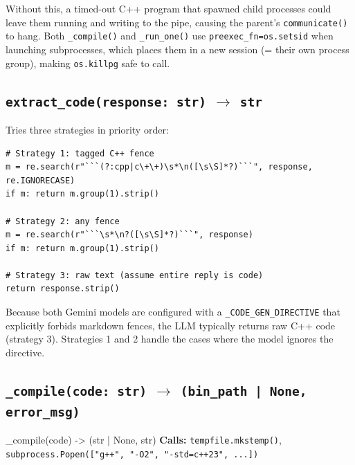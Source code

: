 \documentclass[11pt,a4paper]{report}
\newcommand{\fn}[1]{\texttt{#1}}
\begin{document}
Without this, a timed-out C++ program that spawned child processes could leave them
running and writing to the pipe, causing the parent's \fn{communicate()} to hang.
Both \fn{\_compile()} and \fn{\_run\_one()} use \fn{preexec\_fn=os.setsid} when launching
subprocesses, which places them in a new session (= their own process group), making
\fn{os.killpg} safe to call.

\subsection{\fn{extract\_code(response: str)} $\to$ \fn{str}}

Tries three strategies in priority order:
\begin{lstlisting}[style=example]
# Strategy 1: tagged C++ fence
m = re.search(r"```(?:cpp|c\+\+)\s*\n([\s\S]*?)```", response, re.IGNORECASE)
if m: return m.group(1).strip()

# Strategy 2: any fence
m = re.search(r"```\s*\n?([\s\S]*?)```", response)
if m: return m.group(1).strip()

# Strategy 3: raw text (assume entire reply is code)
return response.strip()
\end{lstlisting}

Because both Gemini models are configured with a \fn{\_CODE\_GEN\_DIRECTIVE} that
explicitly forbids markdown fences, the LLM typically returns raw C++ code (strategy 3).
Strategies 1 and 2 handle the cases where the model ignores the directive.

\subsection{\fn{\_compile(code: str)} $\to$ \fn{(bin\_path | None, error\_msg)}}

\begin{specbox}{\_compile(code) -> (str | None, str)}
\textbf{Calls:} \fn{tempfile.mkstemp()}, \fn{subprocess.Popen(["g++", "-O2", "-std=c++23", ...])}
\end{specbox}
\end{document}
